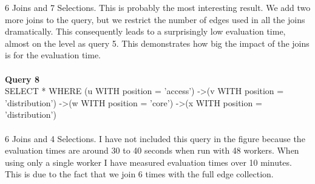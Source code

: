 \documentclass[11pt,singlecolumn]{scrartcl}
\begin{document}
6 Joins and 7 Selections. This is probably the most interesting result. We add two more joins to the query, but we restrict the number of edges used in all the joins dramatically. This consequently leads to a surprisingly low evaluation time, almost on the level as query 5. This demonstrates how big the impact of the joins is for the evaluation time.
\\\\\textbf{Query 8}\\
SELECT * WHERE (u WITH position = 'access') -\textgreater (v WITH position = 'distribution') -\textgreater (w WITH position = 'core') -\textgreater (x WITH position = 'distribution')\\\\
6 Joins and 4 Selections. I have not included this query in the figure because the evaluation times are around 30 to 40 seconds when run with 48 workers. When using only a single worker I have measured evaluation times over 10 minutes. This is due to the fact that we join 6 times with the full edge collection.
\end{document}
